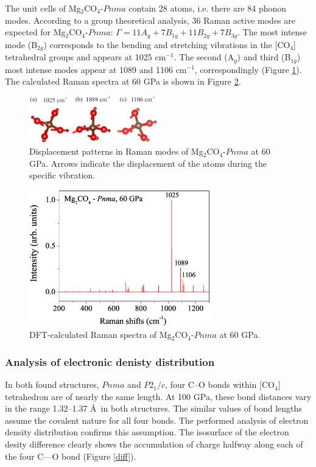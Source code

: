 \documentclass[a4paperm]{article}
\begin{document}
The unit cells of Mg$_2$CO$_4$-$Pnma$ contain 28 atoms, i.e. there are 84 phonon modes. 
According to a group theoretical analysis, 36 Raman active modes are expected for Mg$_2$CO$_4$-$Pnma$: $\Gamma = 11A_g + 7B_{1g} + 11B_{2g} + 7B_{3g}$. 
The most intense mode (B$_{2g}$) corresponds to the bending and stretching vibrations in the [CO$_4$] tetrahedral groups and appears at 1025 cm$^{-1}$. 
The second (A$_g$) and third (B$_{1g}$) most intense modes appear at 1089 and 1106 cm$^{-1}$, correspondingly (Figure \ref{displ}). The calculated Raman spectra at 60 GPa is shown in Figure \ref{raman}.

\begin{figure}[H]
	\includegraphics[width=0.5\textwidth]{dis_pat} \centering
	\caption{Displacement patterns in Raman modes of Mg$_2$CO$_4$-$Pnma$ at 60 GPa. Arrows indicate the displacement of the atoms during the specific vibration.} \label{displ}
\end{figure}

\begin{figure}[H]
	\includegraphics[width=0.7\textwidth]{raman_mg2co4} \centering
	\caption{DFT-calculated Raman spectra of Mg$_2$CO$_4$-$Pnma$ at 60 GPa.} \label{raman}
\end{figure}


\subsubsection*{Analysis of electronic denisty distribution}

In both found structures, $Pnma$ and $P2_1/c$, four C--O bonds within [CO$_4$] tetrahedron are of nearly the same length.
At 100 GPa, these bond distances vary in the range 1.32--1.37 \AA\ in both structures. 
The similar values of bond lengths assume the covalent nature for all four bonds.
The performed analysis of electron density distribution confirms this assumption.
The isosurface of the electron desity difference clearly shows the accumulation of charge halfway along each of the four C—O bond (Figure \ref{diff}).
\end{document}
